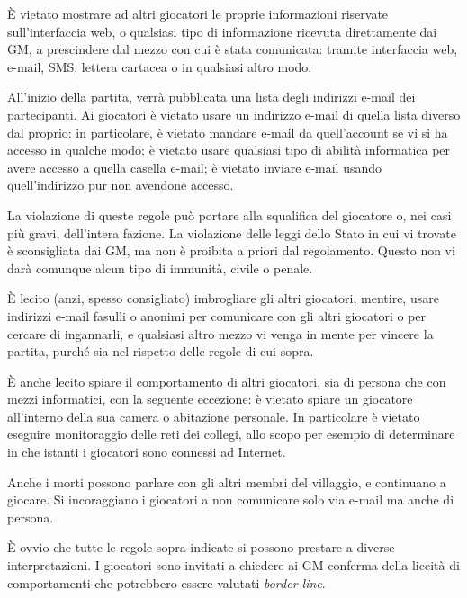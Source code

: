 \documentclass[a4paper,10pt]{article}
\begin{document}
È vietato mostrare ad altri giocatori le proprie informazioni riservate sull'interfaccia web, o qualsiasi tipo di informazione ricevuta direttamente dai GM, a prescindere dal mezzo con cui è stata comunicata: tramite interfaccia web, e-mail, SMS, lettera cartacea o in qualsiasi altro modo.

All'inizio della partita, verrà pubblicata una lista degli indirizzi e-mail dei partecipanti. Ai giocatori è vietato usare un indirizzo e-mail di quella lista diverso dal proprio: in particolare, è vietato mandare e-mail da quell'account se vi si ha accesso in qualche modo; è vietato usare qualsiasi tipo di abilità informatica per avere accesso a quella casella e-mail; è vietato inviare e-mail usando quell'indirizzo pur non avendone accesso.

La violazione di queste regole può portare alla squalifica del giocatore o, nei casi più gravi, dell'intera fazione. La violazione delle leggi dello Stato in cui vi trovate è sconsigliata dai GM, ma non è proibita a priori dal regolamento. Questo non vi darà comunque alcun tipo di immunità, civile o penale.

È lecito (anzi, spesso consigliato) imbrogliare gli altri giocatori, mentire, usare indirizzi e-mail fasulli o anonimi per comunicare con gli altri giocatori o per cercare di ingannarli, e qualsiasi altro mezzo vi venga in mente per vincere la partita, purché sia nel rispetto delle regole di cui sopra.

È anche lecito spiare il comportamento di altri giocatori, sia di persona che con mezzi informatici, con la seguente eccezione: è vietato spiare un giocatore all'interno della sua camera o abitazione personale. In particolare è vietato eseguire monitoraggio delle reti dei collegi, allo scopo per esempio di determinare in che istanti i giocatori sono connessi ad Internet. %

Anche i morti possono parlare con gli altri membri del villaggio, e continuano a giocare. Si incoraggiano i giocatori a non comunicare solo via e-mail ma anche di persona.

È ovvio che tutte le regole sopra indicate si possono prestare a diverse interpretazioni. I giocatori sono invitati a chiedere ai GM conferma della liceità di comportamenti che potrebbero essere valutati \emph{border line}.
\end{document}
